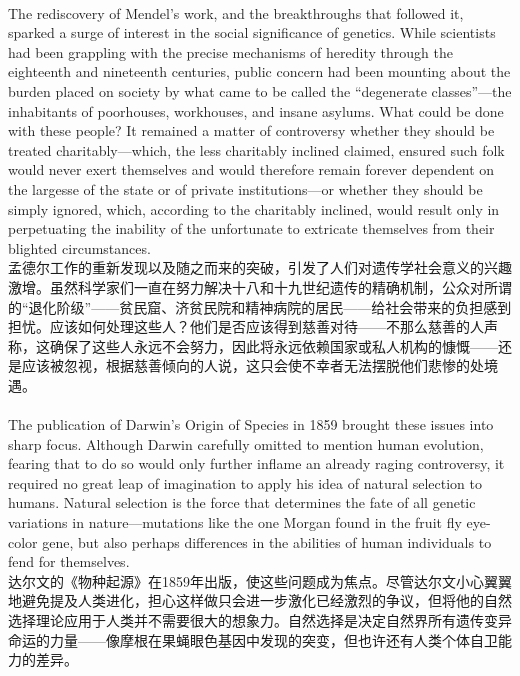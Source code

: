 \documentclass{article}
\begin{document}
\\
The rediscovery of Mendel’s work, and the breakthroughs that followed it, sparked a surge of interest in the social significance of genetics. While scientists had been grappling with the precise mechanisms of heredity through the eighteenth and nineteenth centuries, public concern had been mounting about the burden placed on society by what came to be called the “degenerate classes”—the inhabitants of poorhouses, workhouses, and insane asylums. What could be done with these people? It remained a matter of controversy whether they should be treated charitably—which, the less charitably inclined claimed, ensured such folk would never exert themselves and would therefore remain forever dependent on the largesse of the state or of private institutions—or whether they should be simply ignored, which, according to the charitably inclined, would result only in perpetuating the inability of the unfortunate to extricate themselves from their blighted circumstances.\\
孟德尔工作的重新发现以及随之而来的突破，引发了人们对遗传学社会意义的兴趣激增。虽然科学家们一直在努力解决十八和十九世纪遗传的精确机制，公众对所谓的“退化阶级”——贫民窟、济贫民院和精神病院的居民——给社会带来的负担感到担忧。应该如何处理这些人？他们是否应该得到慈善对待——不那么慈善的人声称，这确保了这些人永远不会努力，因此将永远依赖国家或私人机构的慷慨——还是应该被忽视，根据慈善倾向的人说，这只会使不幸者无法摆脱他们悲惨的处境遇。\\

\\
The publication of Darwin’s Origin of Species in 1859 brought these issues into sharp focus. Although Darwin carefully omitted to mention human evolution, fearing that to do so would only further inflame an already raging controversy, it required no great leap of imagination to apply his idea of natural selection to humans. Natural selection is the force that determines the fate of all genetic variations in nature—mutations like the one Morgan found in the fruit fly eye-color gene, but also perhaps differences in the abilities of human individuals to fend for themselves.\\
达尔文的《物种起源》在1859年出版，使这些问题成为焦点。尽管达尔文小心翼翼地避免提及人类进化，担心这样做只会进一步激化已经激烈的争议，但将他的自然选择理论应用于人类并不需要很大的想象力。自然选择是决定自然界所有遗传变异命运的力量——像摩根在果蝇眼色基因中发现的突变，但也许还有人类个体自卫能力的差异。\\
\end{document}
